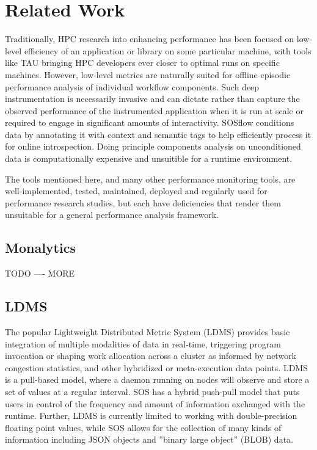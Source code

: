 
\section{Related Work}
%
Traditionally, HPC research into enhancing performance has been
focused on low-level efficiency of an application or library on some
particular machine, with tools like TAU bringing HPC developers ever
closer to optimal runs on specific machines.
%
However, low-level metrics are naturally suited for offline episodic
performance analysis of individual workflow components.
%
Such deep instrumentation is necessarily invasive and can dictate
rather than capture the observed performance of the instrumented
application when it is run at scale or required to engage in
significant amounts of interactivity.
%
SOSflow conditions data by annotating it with context and semantic tags to
help efficiently process it for online introspection.
%
Doing principle components analysis on unconditioned data is
computationally expensive and unsuitible for a runtime environment.
%
\par
%
The tools mentioned here, and many other performance monitoring tools, are
well-implemented, tested, maintained, deployed and regularly used for
performance research studies, but each have deficiencies that render them
unsuitable for a general performance analysis framework. %


\subsection{Monalytics} %
%
TODO ---- MORE
%
\subsection{LDMS} %
%
The popular Lightweight Distributed Metric System (LDMS)
\cite{agelastos2014lightweight} provides basic integration of multiple
modalities of data in real-time, triggering program invocation or
shaping work allocation across a cluster as informed by network
congestion statistics, and other hybridized or meta-execution data
points.
%
LDMS is a pull-based model, where a daemon running on nodes will
observe and store a set of values at a regular interval.
%
SOS has a hybrid push-pull model that puts users in control of the
frequency and amount of information exchanged with the runtime.
%
Further, LDMS is currently limited to working with double-precision
floating point values, while SOS allows for the collection of many
kinds of information including JSON objects and ''binary large
object'' (BLOB) data.
%
